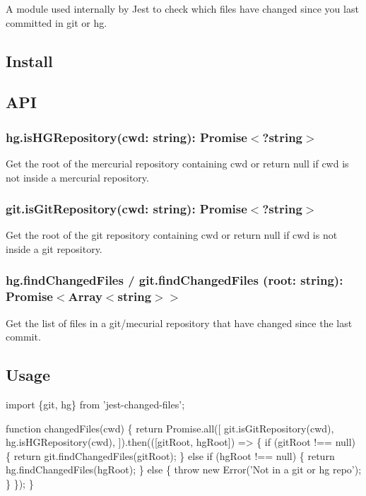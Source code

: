 A module used internally by Jest to check which files have changed since you last committed in git or hg.

\subsection*{Install}




\subsection*{A\+PI}

\subsubsection*{{\ttfamily hg.\+is\+H\+G\+Repository(cwd\+: string)\+: Promise$<$?string$>$}}

Get the root of the mercurial repository containing {\ttfamily cwd} or return {\ttfamily null} if {\ttfamily cwd} is not inside a mercurial repository.

\subsubsection*{{\ttfamily git.\+is\+Git\+Repository(cwd\+: string)\+: Promise$<$?string$>$}}

Get the root of the git repository containing {\ttfamily cwd} or return {\ttfamily null} if {\ttfamily cwd} is not inside a git repository.

\subsubsection*{{\ttfamily hg.\+find\+Changed\+Files / git.\+find\+Changed\+Files (root\+: string)\+: Promise$<$Array$<$string$>$$>$}}

Get the list of files in a git/mecurial repository that have changed since the last commit.

\subsection*{Usage}


\begin{DoxyCode}
import \{git, hg\} from 'jest-changed-files';

function changedFiles(cwd) \{
  return Promise.all([
    git.isGitRepository(cwd),
    hg.isHGRepository(cwd),
  ]).then(([gitRoot, hgRoot]) => \{
    if (gitRoot !== null) \{
      return git.findChangedFiles(gitRoot);
    \} else if (hgRoot !== null) \{
      return hg.findChangedFiles(hgRoot);
    \} else \{
      throw new Error('Not in a git or hg repo');
    \}
  \});
\}
\end{DoxyCode}
 